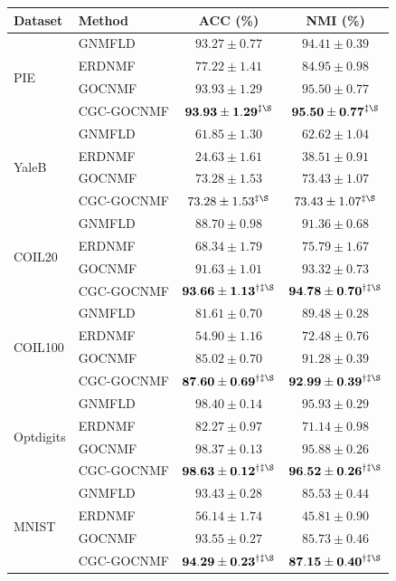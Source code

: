 \documentclass[11pt]{article}
\newenvironment{widetable}
  {\begin{strip}\centering\captionsetup{type=table}}
  {\end{strip}}
\theoremstyle{remark}
\begin{document}
\begin{widetable}
\centering
\caption{Clustering performance of four direct semi-supervised NMF methods on six datasets.}
\label{tab:four_methods}
\small
\setlength{\tabcolsep}{33.2pt}
\begin{tabular}{llcc}
\toprule
Dataset & Method & ACC (\%) & NMI (\%) \\
\midrule
\multirow{4}{*}{PIE}
& GNMFLD & $93.27\pm0.77$ & $94.41\pm0.39$ \\
& ERDNMF & $77.22\pm1.41$ & $84.95\pm0.98$ \\
& GOCNMF & $\mathbf{93.93\pm1.29}$ & $\mathbf{95.50\pm0.77}$ \\
& CGC-GOCNMF & $\mathbf{93.93\pm1.29}^{\ddagger\S}$ & $\mathbf{95.50\pm0.77}^{\ddagger\S}$ \\
\midrule
\multirow{4}{*}{YaleB}
& GNMFLD & $61.85\pm1.30$ & $62.62\pm1.04$ \\
& ERDNMF & $24.63\pm1.61$ & $38.51\pm0.91$ \\
& GOCNMF & $\mathbf{73.28\pm1.53}$ & $\mathbf{73.43\pm1.07}$ \\
& CGC-GOCNMF & $73.28\pm1.53^{\ddagger\S}$ & $73.43\pm1.07^{\ddagger\S}$ \\
\midrule
\multirow{4}{*}{COIL20}
& GNMFLD & $88.70\pm0.98$ & $91.36\pm0.68$ \\
& ERDNMF & $68.34\pm1.79$ & $75.79\pm1.67$ \\
& GOCNMF & $91.63\pm1.01$ & $93.32\pm0.73$ \\
& CGC-GOCNMF & $\mathbf{93.66\pm1.13}^{\dagger\ddagger\S}$ & $\mathbf{94.78\pm0.70}^{\dagger\ddagger\S}$ \\
\midrule
\multirow{4}{*}{COIL100}
& GNMFLD & $81.61\pm0.70$ & $89.48\pm0.28$ \\
& ERDNMF & $54.90\pm1.16$ & $72.48\pm0.76$ \\
& GOCNMF & $85.02\pm0.70$ & $91.28\pm0.39$ \\
& CGC-GOCNMF & $\mathbf{87.60\pm0.69}^{\dagger\ddagger\S}$ & $\mathbf{92.99\pm0.39}^{\dagger\ddagger\S}$ \\
\midrule
\multirow{4}{*}{Optdigits}
& GNMFLD & $98.40\pm0.14$ & $95.93\pm0.29$ \\
& ERDNMF & $82.27\pm0.97$ & $71.14\pm0.98$ \\
& GOCNMF & $98.37\pm0.13$ & $95.88\pm0.26$ \\
& CGC-GOCNMF & $\mathbf{98.63\pm0.12}^{\dagger\ddagger\S}$ & $\mathbf{96.52\pm0.26}^{\dagger\ddagger\S}$ \\
\midrule
\multirow{4}{*}{MNIST}
& GNMFLD & $93.43\pm0.28$ & $85.53\pm0.44$ \\
& ERDNMF & $56.14\pm1.74$ & $45.81\pm0.90$ \\
& GOCNMF & $93.55\pm0.27$ & $85.73\pm0.46$ \\
& CGC-GOCNMF & $\mathbf{94.29\pm0.23}^{\dagger\ddagger\S}$ & $\mathbf{87.15\pm0.40}^{\dagger\ddagger\S}$ \\
\bottomrule
\end{tabular}


\end{widetable}
\end{document}
